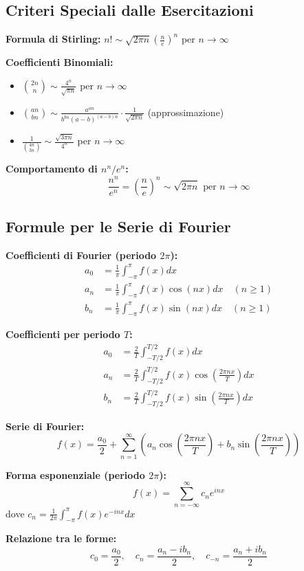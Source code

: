 \subsection{Criteri Speciali dalle Esercitazioni}

\begin{info}
\textbf{Formula di Stirling:} $n! \sim \sqrt{2\pi n}\left(\frac{n}{e}\right)^n$ per $n \to \infty$

\textbf{Coefficienti Binomiali:}
\begin{itemize}
    \item $\binom{2n}{n} \sim \frac{4^n}{\sqrt{\pi n}}$ per $n \to \infty$
    \item $\binom{an}{bn} \sim \frac{a^{an}}{b^{bn}(a-b)^{(a-b)n}} \cdot \frac{1}{\sqrt{2\pi n}}$ (approssimazione)
    \item $\frac{1}{\binom{4n}{3n}} \sim \frac{\sqrt{3\pi n}}{4^n}$ per $n \to \infty$
\end{itemize}

\textbf{Comportamento di $n^n/e^n$:}
\[ \frac{n^n}{e^n} = \left(\frac{n}{e}\right)^n \sim \sqrt{2\pi n} \text{ per } n \to \infty \]
\end{info}

\subsection{Formule per le Serie di Fourier}

\begin{info}
\textbf{Coefficienti di Fourier (periodo $2\pi$):}
\begin{align}
a_0 &= \frac{1}{\pi} \int_{-\pi}^{\pi} f(x) dx \\
a_n &= \frac{1}{\pi} \int_{-\pi}^{\pi} f(x) \cos(nx) dx \quad (n \geq 1) \\
b_n &= \frac{1}{\pi} \int_{-\pi}^{\pi} f(x) \sin(nx) dx \quad (n \geq 1)
\end{align}

\textbf{Coefficienti per periodo $T$:}
\begin{align}
a_0 &= \frac{2}{T} \int_{-T/2}^{T/2} f(x) dx \\
a_n &= \frac{2}{T} \int_{-T/2}^{T/2} f(x) \cos\left(\frac{2\pi nx}{T}\right) dx \\
b_n &= \frac{2}{T} \int_{-T/2}^{T/2} f(x) \sin\left(\frac{2\pi nx}{T}\right) dx
\end{align}

\textbf{Serie di Fourier:}
\[ f(x) = \frac{a_0}{2} + \sum_{n=1}^{\infty} \left(a_n \cos\left(\frac{2\pi nx}{T}\right) + b_n \sin\left(\frac{2\pi nx}{T}\right)\right) \]

\textbf{Forma esponenziale (periodo $2\pi$):}
\[ f(x) = \sum_{n=-\infty}^{\infty} c_n e^{inx} \]
dove $c_n = \frac{1}{2\pi} \int_{-\pi}^{\pi} f(x) e^{-inx} dx$

\textbf{Relazione tra le forme:}
\[ c_0 = \frac{a_0}{2}, \quad c_n = \frac{a_n - ib_n}{2}, \quad c_{-n} = \frac{a_n + ib_n}{2} \]
\end{info}

